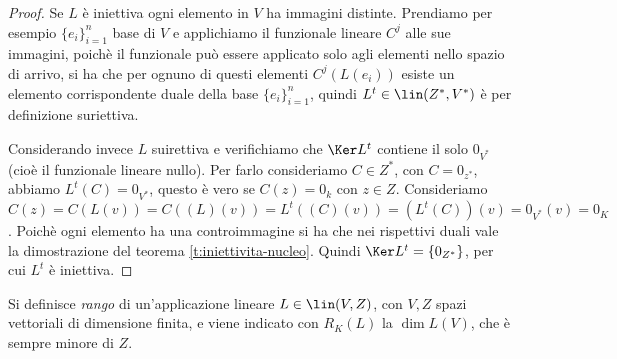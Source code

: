 \begin{proof}
	Se $L$ è iniettiva ogni elemento in $V$ ha immagini distinte.
	Prendiamo per esempio $\{e_i\}_{i=1}^n$ base di $V$ e applichiamo il funzionale lineare $C^j$ alle sue immagini, poichè il funzionale può essere applicato solo agli elementi nello spazio di arrivo, si ha che per ognuno di questi elementi $C^j(L(e_i))$ esiste un elemento corrispondente duale della base $\{e_i\}_{i=1}^n$, quindi $L^t\in \lin(Z^*,V^*)$ è per definizione suriettiva.  

	Considerando invece $L$ suirettiva e verifichiamo che $\Ker L^t$ contiene il solo $0_{V^*}$ (cioè il funzionale lineare nullo).
	Per farlo consideriamo $C\in Z^*$, con $C=0_{z^*}$, abbiamo $L^t(C) = 0_{V^*}$, questo è vero se $C(  z)=0_k$ con $  z\in Z$.
	Consideriamo $C(  z) = C(L(  v)) = C((L)(  v)) = L^t((C)(  v)) = (L^t(C))(  v) = 0_{V^*}(  v) = 0_K$.
	Poichè ogni elemento ha una controimmagine si ha che nei rispettivi duali vale la dimostrazione del teorema \ref{t:iniettivita-nucleo}.
	Quindi $\Ker L^t = \{0_{Z^*}\}$, per cui $L^t$ è iniettiva.    
\end{proof}
\begin{definizione} \label{d:rango-applicazione-lineare}
	Si definisce \emph{rango} di un'applicazione lineare $L\in\lin(V,Z)$, con $V,Z$ spazi vettoriali di dimensione finita, e viene indicato con $R_K(L)$ la $\dim L(V)$, che è sempre minore di $Z$.
\end{definizione}


